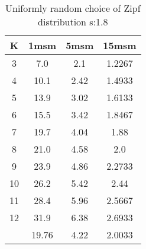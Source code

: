 \begin{table}[H]
\centering
\begin{tabular}{c|ccc}
K &1msm &5msm &15msm\\
\hline
3 & 7.0 & 2.1 & 1.2267\\
4 & 10.1 & 2.42 & 1.4933\\
5 & 13.9 & 3.02 & 1.6133\\
6 & 15.5 & 3.42 & 1.8467\\
7 & 19.7 & 4.04 & 1.88\\
8 & 21.0 & 4.58 & 2.0\\
9 & 23.9 & 4.86 & 2.2733\\
10 & 26.2 & 5.42 & 2.44\\
11 & 28.4 & 5.96 & 2.5667\\
12 & 31.9 & 6.38 & 2.6933\\
\hline
& 19.76 & 4.22 & 2.0033\\
\end{tabular}
\caption{Uniformly random choice of Zipf distribution s:1.8}
\label{tab:s1.8}
\end{table}
